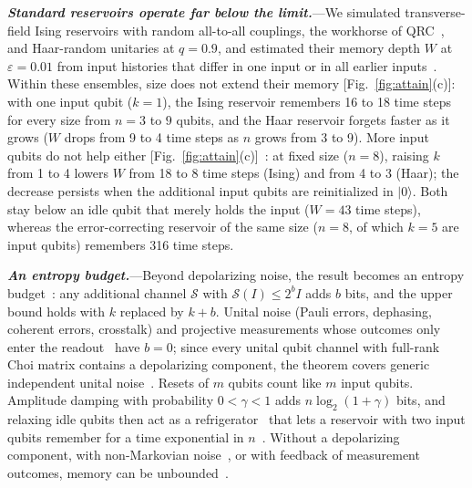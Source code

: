 \documentclass[aps,prl,twocolumn,superscriptaddress,floatfix]{revtex4-2}
\theoremstyle{plain}
\newcommand{\ket}[1]{|#1\rangle}
\newcommand{\runin}[1]{\textit{\textbf{#1}}---}
\begin{document}
\runin{Standard reservoirs operate far below the limit.}We simulated transverse-field Ising reservoirs with random all-to-all couplings, the workhorse of QRC~\cite{Fujii2017,Nakajima2019,MartinezPena2021}, and Haar-random unitaries at $q=0.9$, and estimated their memory depth $W$ at $\varepsilon=0.01$ from input histories that differ in one input or in all earlier inputs~\cite{SM}. Within these ensembles, size does not extend their memory [Fig.~\ref{fig:attain}(c)]: with one input qubit ($k=1$), the Ising reservoir remembers 16 to 18 time steps for every size from $n=3$ to $9$ qubits, and the Haar reservoir forgets faster as it grows ($W$ drops from 9 to 4 time steps as $n$ grows from 3 to 9). More input qubits do not help either [Fig.~\ref{fig:attain}(c)]~\cite{SM}: at fixed size ($n=8$), raising $k$ from 1 to 4 lowers $W$ from 18 to 8 time steps (Ising) and from 4 to 3 (Haar); the decrease persists when the additional input qubits are reinitialized in $\ket0$. Both stay below an idle qubit that merely holds the input ($W=43$ time steps), whereas the error-correcting reservoir of the same size ($n=8$, of which $k=5$ are input qubits) remembers 316 time steps.

\runin{An entropy budget.}Beyond depolarizing noise, the result becomes an entropy budget~\cite{SM}: any additional channel $\mathcal S$ with $\mathcal S(I)\le2^bI$ adds $b$ bits, and the upper bound holds with $k$ replaced by $k+b$. Unital noise (Pauli errors, dephasing, coherent errors, crosstalk) and projective measurements whose outcomes only enter the readout~\cite{Mujal2023} have $b=0$; since every unital qubit channel with full-rank Choi matrix contains a depolarizing component, the theorem covers generic independent unital noise~\cite{SM}. Resets of $m$ qubits count like $m$ input qubits. Amplitude damping with probability $0<\gamma<1$ adds $n\log_2(1+\gamma)$ bits, and relaxing idle qubits then act as a refrigerator~\cite{BenOr2013} that lets a reservoir with two input qubits remember for a time exponential in $n$~\cite{SM,Hoeffding1963}. Without a depolarizing component, with non-Markovian noise~\cite{Sannia2026}, or with feedback of measurement outcomes, memory can be unbounded~\cite{SM}.
\end{document}
